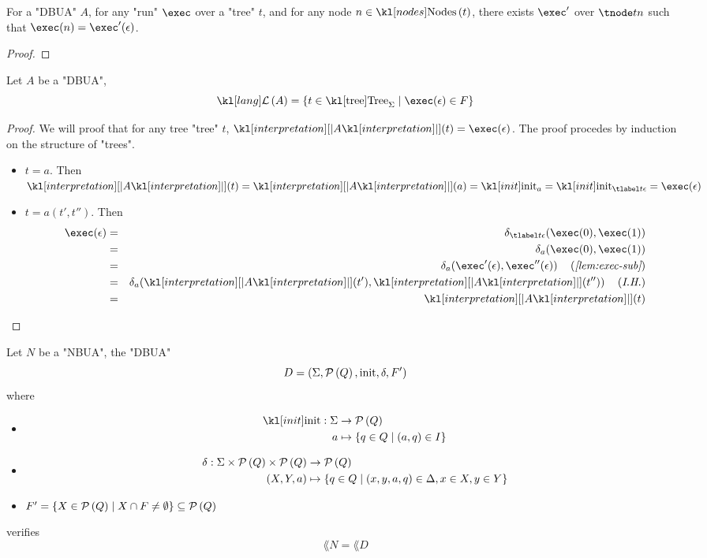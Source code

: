 \documentclass{article}
\begin{document}
\begin{lemma}\label{lem:exec-sub}
	For a "DBUA" $A$, for any "run" $\exec$ over a "tree" $t$, and for any node $n \in \nodes t$, there exists $\exec'$ over
	$\tnode t n$ such that $\exec (n) = \exec'(\epsilon)$.
\end{lemma}

\begin{proof}
	\todo{}
\end{proof}

\begin{lemma}
	Let $A$ be a "DBUA",
	\[ \lang A = \setdef {t \in \tree_{\Sigma}} {\exec (\epsilon) \in F} \]
\end{lemma}

\begin{proof}
	We will proof that for any tree  "tree" $t$, $\interpret A (t) = \exec (\epsilon)$.
	The proof procedes by induction on the structure of "trees".
	\begin{itemize}
		\item $t = a$. Then
		      $\interpret A (t) = \interpret A (a)=  \init_a = \init_{\tlabel t {\epsilon}} = \exec (\epsilon)$
		\item $t = a(t',t'')$. Then
		      \begin{eqnarray*}
			      \exec (\epsilon)  &=& \delta_{\tlabel t {\epsilon}}(\exec (0), \exec (1)) \\
			      &=& \delta_a (\exec (0), \exec (1)) \\
			      &=& \delta_a (\exec' (\epsilon), \exec''  (\epsilon))  \reason{\ref{lem:exec-sub}}\\
			      &=& \delta_a (\interpret A (t'), \interpret A (t'')) \reason{I.H.}\\
			      &=& \interpret A (t)
		      \end{eqnarray*}
	\end{itemize}
\end{proof}

\begin{theorem}
	Let $N$ be a "NBUA", the "DBUA"
	\[ D = (\Sigma, \mathcal{P}\left(Q\right), \text{init} , \delta , F' ) \]
	where
	\begin{itemize}
		\item \begin{align*}
			      \init : \Sigma & \to      \parts Q                        \\
			      a              & \mapsto  \setdef {q \in Q} {(a,q) \in I}
		      \end{align*}
		\item \begin{align*}
			      \delta   : \Sigma \times \mathcal{P}\left(Q\right) \times \mathcal{P}\left(Q\right) & \to \mathcal{P}\left(Q\right)                                                        \\
			      ( X, Y, a)                                        & \mapsto \left\{q \in  Q \mid (x,y,a,q) \in \Delta, x \in X, y \in Y\right\}
		      \end{align*}
		\item $F'  = \left\{X \in \mathcal{P}\left(Q\right) \mid X \cap F \neq \emptyset\right\} \subseteq \mathcal{P}\left(Q\right)$
	\end{itemize}
	verifies
	\[ \lang N = \lang D \]
\end{theorem}
\end{document}
